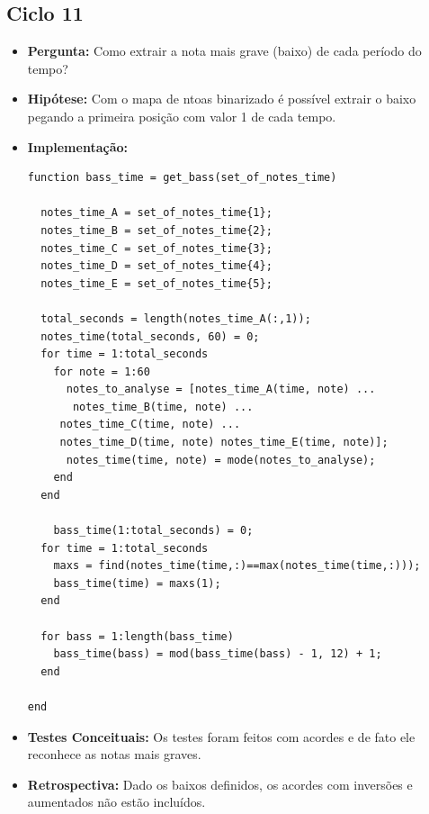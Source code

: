 \subsection{Ciclo 11}
\label{subsec:ciclo_11}
\begin{itemize}
\item \textbf{Pergunta:} Como extrair a nota mais grave (baixo) de cada período do tempo?
\item \textbf{Hipótese:} Com o mapa de ntoas binarizado é possível extrair o baixo pegando a primeira posição com valor 1 de cada tempo.
\item \textbf{Implementação:}
\begin{lstlisting}
function bass_time = get_bass(set_of_notes_time)

  notes_time_A = set_of_notes_time{1};
  notes_time_B = set_of_notes_time{2};
  notes_time_C = set_of_notes_time{3};
  notes_time_D = set_of_notes_time{4};
  notes_time_E = set_of_notes_time{5};

  total_seconds = length(notes_time_A(:,1));
  notes_time(total_seconds, 60) = 0;
  for time = 1:total_seconds
    for note = 1:60
      notes_to_analyse = [notes_time_A(time, note) ...
       notes_time_B(time, note) ...
     notes_time_C(time, note) ...
     notes_time_D(time, note) notes_time_E(time, note)];
      notes_time(time, note) = mode(notes_to_analyse);
    end
  end

    bass_time(1:total_seconds) = 0;
  for time = 1:total_seconds
    maxs = find(notes_time(time,:)==max(notes_time(time,:)));
    bass_time(time) = maxs(1);
  end

  for bass = 1:length(bass_time)
    bass_time(bass) = mod(bass_time(bass) - 1, 12) + 1;
  end

end
\end{lstlisting}
\item \textbf{Testes Conceituais:} Os testes foram feitos com acordes e de fato ele reconhece as notas mais graves.
\item \textbf{Retrospectiva:} Dado os baixos definidos, os acordes com inversões e aumentados não estão incluídos.
\end{itemize}



